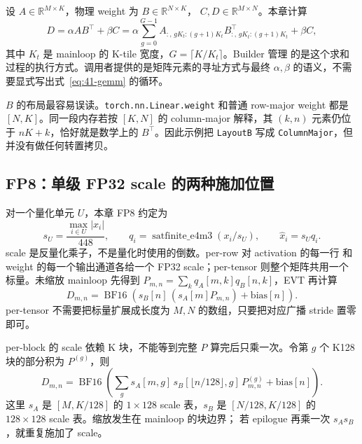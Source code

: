 设 $A\in\mathbb R^{M\times K}$，物理 weight 为 $B\in\mathbb R^{N\times K}$，
$C,D\in\mathbb R^{M\times N}$。本章计算
\begin{equation}
  D=\alpha AB^{\top}+\beta C
   =\alpha\sum_{g=0}^{G-1}A_{:,\,gK_t:(g+1)K_t}
       B_{:,\,gK_t:(g+1)K_t}^{\top}+\beta C,
  \label{eq:41-gemm}
\end{equation}
其中 $K_t$ 是 mainloop 的 K-tile 宽度，$G=\lceil K/K_t\rceil$。Builder 管理
的是这个求和过程的执行方式。调用者提供的是矩阵元素的寻址方式与最终
$\alpha,\beta$ 的语义，不需要显式写出式~\ref{eq:41-gemm} 的循环。

$B$ 的布局最容易误读。\texttt{torch.nn.Linear.weight} 和普通 row-major
weight 都是 $[N,K]$。同一段内存若按 $[K,N]$ 的 column-major 解释，其
$(k,n)$ 元素仍位于 $nK+k$，恰好就是数学上的 $B^{\top}$。因此示例把
\texttt{LayoutB} 写成 \texttt{ColumnMajor}，但并没有做任何转置拷贝。

\subsection{FP8：单级 FP32 scale 的两种施加位置}

对一个量化单元 $U$，本章 FP8 约定为
\begin{equation}
  s_U=\frac{\max_{i\in U}|x_i|}{448},\qquad
  q_i=\operatorname{satfinite\_e4m3}(x_i/s_U),\qquad
  \hat x_i=s_Uq_i.
  \label{eq:41-fp8-quant}
\end{equation}
scale 是反量化乘子，不是量化时使用的倒数。per-row 对 activation 的每一行
和 weight 的每一个输出通道各给一个 FP32 scale；per-tensor 则整个矩阵共用一个
标量。未缩放 mainloop 先得到
$P_{m,n}=\sum_k q_A[m,k]q_B[n,k]$，EVT 再计算
\begin{equation}
  D_{m,n}=\operatorname{BF16}\!\left(
    s_B[n]\,(s_A[m]P_{m,n})+\mathrm{bias}[n]\right).
  \label{eq:41-fp8-evt}
\end{equation}
per-tensor 不需要把标量扩展成长度为 $M,N$ 的数组，只要把对应广播 stride
置零即可。

per-block 的 scale 依赖 K 块，不能等到完整 $P$ 算完后只乘一次。令第 $g$
个 K128 块的部分积为 $P^{(g)}$，则
\begin{equation}
  D_{m,n}=\operatorname{BF16}\!\left(
    \sum_g s_A[m,g]\,s_B[\lfloor n/128\rfloor,g]\,P^{(g)}_{m,n}
    +\mathrm{bias}[n]\right).
  \label{eq:41-fp8-block}
\end{equation}
这里 $s_A$ 是 $[M,K/128]$ 的 $1\times128$ scale 表，$s_B$ 是
$[N/128,K/128]$ 的 $128\times128$ scale 表。缩放发生在 mainloop 的块边界；
若 epilogue 再乘一次 $s_As_B$，就重复施加了 scale。

